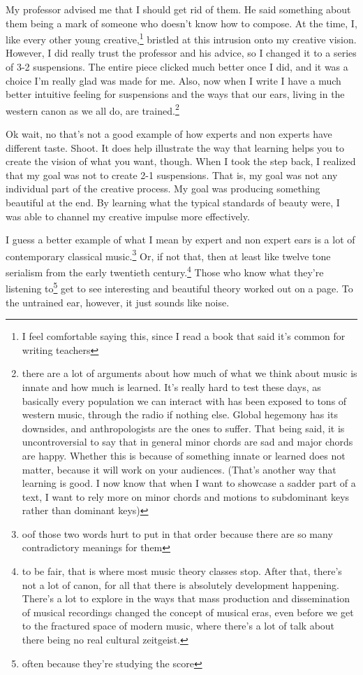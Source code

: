 \documentclass[12pt]{article}[titlepage]
\newcommand{\1}{\={a}}
\newcommand{\2}{\={e}}
\newcommand{\3}{\={\i}}
\newcommand{\4}{\=o}
\newcommand{\5}{\=u}
\newcommand{\6}{\={A}}
\renewcommand{\,}{\textsuperscript{,}}
\begin{document}
My professor advised me that I should get rid of them.
He said something about them being a mark of someone who doesn't know how to compose.
At the time, I, like every other young creative,\footnote{I feel comfortable saying this, since I read a book that said it's common for writing teachers} bristled at this intrusion onto my creative vision.
However, I did really trust the professor and his advice, so I changed it to a series of 3-2 suspensions.
The entire piece clicked much better once I did, and it was a choice I'm really glad was made for me.
Also, now when I write I have a much better intuitive feeling for suspensions and the ways that our ears, living in the western canon as we all do, are trained.\footnote{there are a lot of arguments about how much of what we think about music is innate and how much is learned.
It's really hard to test these days, as basically every population we can interact with has been exposed to tons of western music, through the radio if nothing else.
Global hegemony has its downsides, and anthropologists are the ones to suffer.
That being said, it is uncontroversial to say that in general minor chords are sad and major chords are happy.
Whether this is because of something innate or learned does not matter, because it will work on your audiences.
(That's another way that learning is good.
I now know that when I want to showcase a sadder part of a text, I want to rely more on minor chords and motions to subdominant keys rather than dominant keys)}

Ok wait, no that's not a good example of how experts and non experts have different taste.
Shoot.
It does help illustrate the way that learning helps you to create the vision of what you want, though.
When I took the step back, I realized that my goal was not to create 2-1 suspensions.
That is, my goal was not any individual part of the creative process.
My goal was producing something beautiful at the end.
By learning what the typical standards of beauty were, I was able to channel my creative impulse more effectively.

I guess a better example of what I mean by expert and non expert ears is a lot of contemporary classical music.\footnote{oof those two words hurt to put in that order because there are so many contradictory meanings for them}
Or, if not that, then at least like twelve tone serialism from the early twentieth century.\footnote{to be fair, that is where most music theory classes stop.
After that, there's not a lot of canon, for all that there is absolutely development happening.
There's a lot to explore in the ways that mass production and dissemination of musical recordings changed the concept of musical eras, even before we get to the fractured space of modern music, where there's a lot of talk about there being no real cultural zeitgeist.}
Those who know what they're listening to\footnote{often because they're studying the score} get to see interesting and beautiful theory worked out on a page.
To the untrained ear, however, it just sounds like noise.
\end{document}
